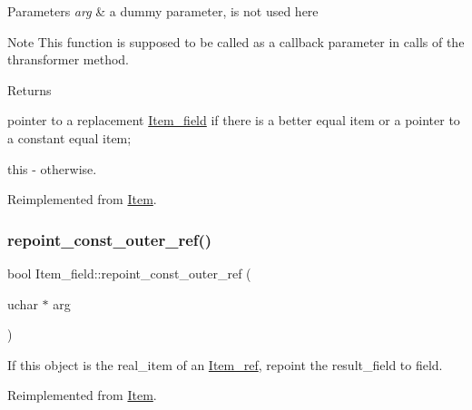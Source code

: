 \begin{DoxyParams}{Parameters}
{\em arg} & a dummy parameter, is not used here\\
\hline
\end{DoxyParams}
\begin{DoxyNote}{Note}
This function is supposed to be called as a callback parameter in calls of the thransformer method.
\end{DoxyNote}
\begin{DoxyReturn}{Returns}

\begin{DoxyItemize}
\item pointer to a replacement \mbox{\hyperlink{classItem__field}{Item\+\_\+field}} if there is a better equal item or a pointer to a constant equal item;
\item this -\/ otherwise. 
\end{DoxyItemize}
\end{DoxyReturn}


Reimplemented from \mbox{\hyperlink{classItem}{Item}}.

\mbox{\label{classItem__field_ac5eaad612e0fbd977769930c7c0829ae}} 
\subsubsection{\texorpdfstring{repoint\+\_\+const\+\_\+outer\+\_\+ref()}{repoint\_const\_outer\_ref()}}
{\footnotesize\ttfamily bool Item\+\_\+field\+::repoint\+\_\+const\+\_\+outer\+\_\+ref (\begin{DoxyParamCaption}\item[{uchar $\ast$}]{arg }\end{DoxyParamCaption})\hspace{0.3cm}{\ttfamily [virtual]}}

If this object is the real\+\_\+item of an \mbox{\hyperlink{classItem__ref}{Item\+\_\+ref}}, repoint the result\+\_\+field to field. 

Reimplemented from \mbox{\hyperlink{classItem_a8deff5e761c2a4fc89e60df1389da969}{Item}}.

\mbox{\label{classItem__field_afa7f930bfb3fd7cbf4be67a37e3ce7b0}} 

